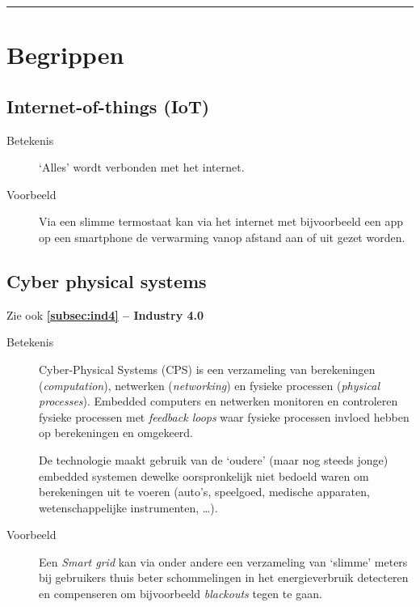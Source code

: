 \documentclass[11pt,a4paper,twoside]{article} %
\begin{document}
\maketitle
\vspace{-1cm}
\noindent\rule{\textwidth}{1pt}
\vspace{0.5cm}

\tableofcontents

\clearpage

\section{Begrippen}

\subsection{Internet-of-things (IoT)}

\begin{description}
	\item [Betekenis] `Alles' wordt verbonden met het internet.
	\item [Voorbeeld] Via een slimme termostaat kan via het internet met bijvoorbeeld een app op een smartphone de verwarming vanop afstand aan of uit gezet worden.
\end{description}


\subsection{Cyber physical systems}

Zie ook \textbf{\ref{subsec:ind4} -- Industry 4.0}
\vspace{-0.5cm}

\begin{description}
	\item [Betekenis] \cite{cps} Cyber-Physical Systems (CPS) is een verzameling van berekeningen (\textit{computation}), netwerken (\textit{networking}) en fysieke processen (\textit{physical processes}). Embedded computers en netwerken monitoren en controleren fysieke processen met \textit{feedback loops} waar fysieke processen invloed hebben op berekeningen en omgekeerd. 
	
	De technologie maakt gebruik van de `oudere' (maar nog steeds jonge) embedded systemen dewelke oorspronkelijk niet bedoeld waren om berekeningen uit te voeren (auto's, speelgoed, medische apparaten, wetenschappelijke instrumenten, \dots).

	\item [Voorbeeld] Een \textit{Smart grid} \cite{smartGrid} kan via onder andere een verzameling van `slimme' meters bij gebruikers thuis beter schommelingen in het energieverbruik detecteren en compenseren om bijvoorbeeld \textit{blackouts} tegen te gaan.
\end{description}
\end{document}
